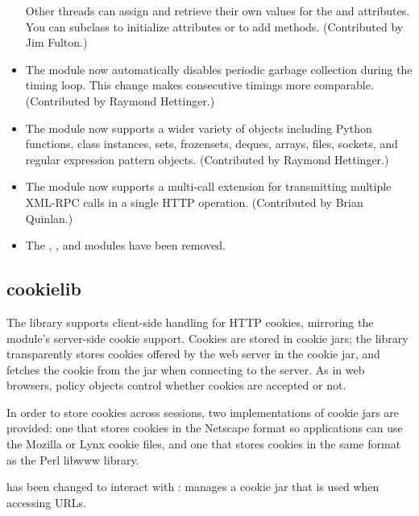 \documentclass{howto}
\begin{document}
\begin{itemize}
Other threads can assign and retrieve their own values for the
 and  attributes.  You can subclass
 to initialize attributes or to add methods.
(Contributed by Jim Fulton.)

\item The  module now automatically disables periodic
  garbage collection during the timing loop.  This change makes
  consecutive timings more comparable.  (Contributed by Raymond Hettinger.)

\item The  module now supports a wider variety of objects
   including Python functions, class instances, sets, frozensets, deques,
   arrays, files, sockets, and regular expression pattern objects.
   (Contributed by Raymond Hettinger.)

\item The  module now supports a multi-call extension for 
transmitting multiple XML-RPC calls in a single HTTP operation.
(Contributed by Brian Quinlan.)

\item The , , and  modules have 
been removed.
   
\end{itemize}



\subsection{cookielib}

The  library supports client-side handling for HTTP
cookies, mirroring the  module's server-side cookie
support. Cookies are stored in cookie jars; the library transparently
stores cookies offered by the web server in the cookie jar, and
fetches the cookie from the jar when connecting to the server. As in
web browsers, policy objects control whether cookies are accepted or
not.

In order to store cookies across sessions, two implementations of
cookie jars are provided: one that stores cookies in the Netscape
format so applications can use the Mozilla or Lynx cookie files, and
one that stores cookies in the same format as the Perl libwww library.

 has been changed to interact with :
 manages a cookie jar that is used when
accessing URLs.
\end{document}
